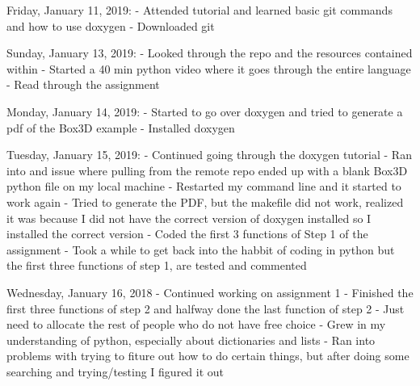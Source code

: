 Friday, January 11, 2019:
	- Attended tutorial and learned basic git commands and how to use doxygen
	- Downloaded git

Sunday, January 13, 2019:
	- Looked through the repo and the resources contained within
	- Started a 40 min python video where it goes through the entire language
	- Read through the assignment 

Monday, January 14, 2019:
	- Started to go over doxygen and tried to generate a pdf of the Box3D example
	- Installed doxygen

Tuesday, January 15, 2019:
	- Continued going through the doxygen tutorial
	- Ran into and issue where pulling from the remote repo ended up with a blank Box3D python file on my local machine
	- Restarted my command line and it started to work again
	- Tried to generate the PDF, but the makefile did not work, realized it was because I did not have the correct version of doxygen installed so I installed the correct version
	- Coded the first 3 functions of Step 1 of the assignment
	- Took a while to get back into the habbit of coding in python but the first three functions of step 1, are tested and commented

Wednesday, January 16, 2018
	- Continued working on assignment 1
	- Finished the first three functions of step 2 and halfway done the last function of step 2
	- Just need to allocate the rest of people who do not have free choice
	- Grew in my understanding of python, especially about dictionaries and lists
	- Ran into problems with trying to fiture out how to do certain things, but after doing some searching and trying/testing I figured it out

